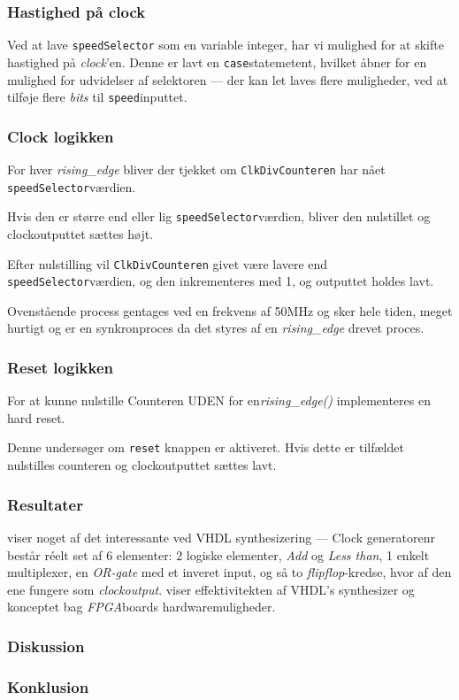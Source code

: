 {

\subsubsection*{Hastighed på clock}
Ved at lave \texttt{speedSelector} som en variable integer, har vi mulighed for at skifte hastighed på \emph{clock}'en. Denne er lavt en \texttt{case}statemetent, hvilket åbner for en mulighed for udvidelser af selektoren --- der kan let laves flere muligheder, ved at tilføje flere \emph{bits} til \texttt{speed}inputtet.



\subsubsection*{Clock logikken}
For hver \emph{rising\_edge} bliver der tjekket om \texttt{ClkDivCounteren} har nået \texttt{speedSelector}værdien.

Hvis den er større end eller lig \texttt{speedSelector}værdien, bliver den nulstillet og clockoutputtet sættes højt.

Efter nulstilling vil \texttt{ClkDivCounteren} givet være lavere end \texttt{speedSelector}værdien, og den inkrementeres med 1, og outputtet holdes lavt.

Ovenstående process gentages ved en frekvens af 50MHz og sker hele tiden, meget hurtigt og er en synkronproces da det styres af en \emph{rising\_edge} drevet proces.

\subsubsection*{Reset logikken}
For at kunne nulstille Counteren UDEN for en\emph{rising\_edge()} implementeres en hard reset.

Denne undersøger om \texttt{reset} knappen er aktiveret. Hvis dette er tilfældet nulstilles counteren og clockoutputtet sættes lavt.

\subsubsection{Resultater}

 viser noget af det interessante ved VHDL synthesizering --- Clock generatorenr består réelt set af 6 elementer: 2 logiske elementer, \emph{Add} og \emph{Less than}, 1 enkelt multiplexer, en \emph{OR-gate} med et inveret input, og så to \emph{flipflop}-kredse, hvor af den ene fungere som \emph{clockoutput}.  viser effektivitekten af VHDL's synthesizer og konceptet bag \emph{FPGA}boards hardwaremuligheder.



\subsubsection{Diskussion}

\subsubsection{Konklusion}

}